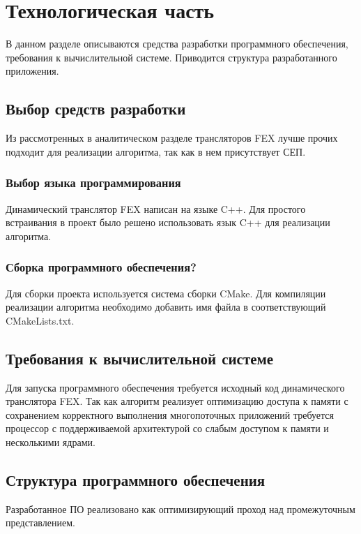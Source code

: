\section{Технологическая часть}

В данном разделе описываются средства разработки программного обеспечения, требования к вычислительной системе. Приводится структура разработанного приложения.

\subsection{Выбор средств разработки}

Из рассмотренных в аналитическом разделе трансляторов FEX лучше прочих подходит для реализации алгоритма, так как в нем присутствует СЕП.

\subsubsection{Выбор языка программирования}

Динамический транслятор FEX написан на языке C++. Для простого встраивания в проект было решено использовать язык C++ для реализации алгоритма.

\subsubsection{Сборка программного обеспечения?}

Для сборки проекта используется система сборки
CMake. Для компиляции реализации алгоритма необходимо добавить имя файла в соответствующий CMakeLists.txt.

\subsection{Требования к вычислительной системе}

Для запуска программного обеспечения требуется исходный код динамического транслятора FEX. Так как алгоритм реализует оптимизацию доступа к памяти с сохранением корректного выполнения многопоточных приложений требуется процессор с поддерживаемой архитектурой со слабым доступом к памяти и несколькими ядрами.

\subsection{Структура программного обеспечения}

Разработанное ПО реализовано как оптимизирующий проход над промежуточным представлением.

